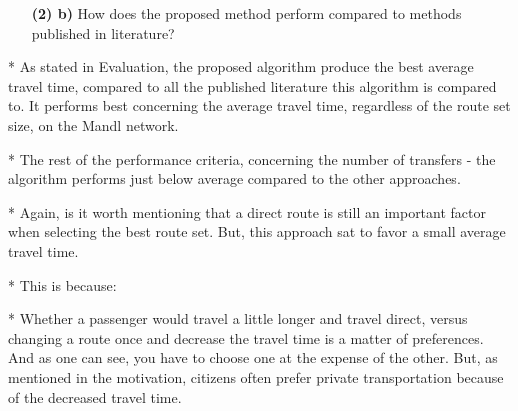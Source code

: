     


\begin{itemize}
\item[\textbf{(2) b)}] How does the proposed method perform compared to methods published in literature?
\end{itemize}
* As stated in Evaluation, the proposed algorithm produce the best average travel time, compared to all the published literature this algorithm is compared to. It performs best concerning the average travel time, regardless of the route set size, on the Mandl network. 

* The rest of the performance criteria, concerning the number of transfers - the algorithm performs just below average compared to the other approaches. 

* Again, is it worth mentioning that a direct route is still an important factor when selecting the best route set. But, this approach sat to favor a small average travel time.

* This is because:

* Whether a passenger would travel a little longer and travel direct, versus changing a route once and decrease the travel time is a matter of preferences. And as one can see, you have to choose one at the expense of the other. But, as mentioned in the motivation, citizens often prefer private transportation because of the decreased travel time. 
